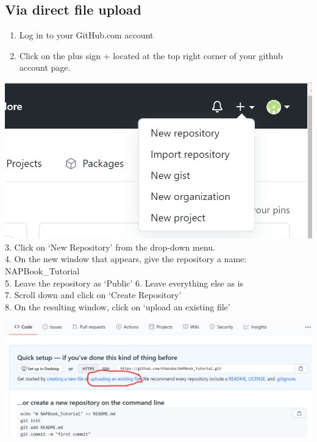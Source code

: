 \documentclass[
]{book}
\providecommand{\tightlist}{%
  \setlength{\itemsep}{0pt}\setlength{\parskip}{0pt}}
\let\origfigure\figure
\let\endorigfigure\endfigure
\renewenvironment{figure}[1][2] {
    \expandafter\origfigure\expandafter[H]
} {
    \endorigfigure
}
\begin{document}
\hypertarget{via-direct-file-upload}{%
\subsection{Via direct file upload}\label{via-direct-file-upload}}

\begin{enumerate}
\def\labelenumi{\arabic{enumi}.}
\tightlist
\item
  Log in to your GitHub.com account
\item
  Click on the plus sign + located at the top right corner of your github account page.
\end{enumerate}

\includegraphics{tutorial_screenshots/gh_create_repo.png}\\
3. Click on `New Repository' from the drop-down menu.\\
4. On the new window that appears, give the repository a name: NAPBook\_Tutorial\\
5. Leave the repository as `Public'
6. Leave everything else as is\\
7. Scroll down and click on `Create Repository'\\
8. On the resulting window, click on `upload an existing file'

\begin{figure}
\centering
\includegraphics{tutorial_screenshots/gh_uploadfiles.png}
\caption{import repo to github}
\end{figure}
\end{document}
